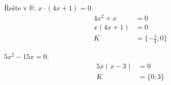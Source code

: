 \documentclass[11pt,a4paper]{article}
\begin{document}
\begin{zadaniReseniBox}[title={Rozšíření 1}]
Řešte v $\mathbb R$: $x \cdot \left(4x + 1\right)=0$.
\tcblower
\[
\begin{aligned}4x^2+x&=0\\x(4x+1)&=0\\K&=\{-\frac14;0\}\end{aligned}
\]
\end{zadaniReseniBox}

\begin{zadaniReseniBox}[title={Rozšíření 2}]
$5x^2-15x=0$.
\tcblower
\[\begin{aligned}
5x(x-3)&=0\\K&=\{0;3\}
\end{aligned}\]
\end{zadaniReseniBox}
\end{document}
